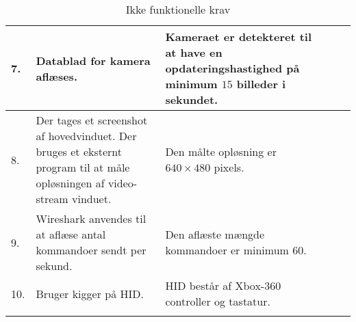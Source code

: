 \begin{longtable}{| l | L{4cm} | Z | Z | L{3 cm} |}
	7. 	& Datablad for kamera aflæses.
		& Kameraet er detekteret til at have en opdateringshastighed på minimum $15$ billeder i sekundet.
		& 
		& \\ \hline
       
    8. 	& Der tages et screenshot af hovedvinduet. Der bruges et eksternt program til at måle opløsningen af video-stream vinduet.
    	& Den målte opløsning er $640 \times 480$ pixels.
    	& 
    	& \\ \hline
    
    9. 	& Wireshark anvendes til at aflæse antal kommandoer sendt per sekund.
    	& Den aflæste mængde kommandoer er minimum $60$.
    	& 
    	& \\ \hline
    	
    10.	& Bruger kigger på HID.
    	& HID består af Xbox-360 controller og tastatur.
    	& 
    	& \\ \hline    	
    	
    
\caption{Ikke funktionelle krav}
\label{tbl:ikkefunk}
\end{longtable}
